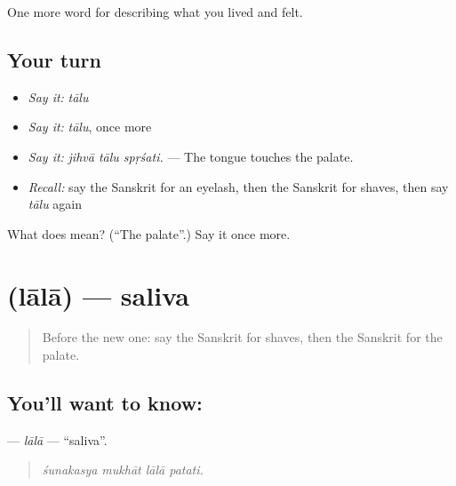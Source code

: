 \begin{grammarlens}[title={What you've built}]
One more word for describing what you lived and felt.
\end{grammarlens}

\subsection*{Your turn}
\begin{itemize}
\raggedright
  \item \emph{Say it:} \emph{tālu}
  \item \emph{Say it:} \emph{tālu}, once more
  \item \emph{Say it:} \emph{jihvā tālu spṛśati.} — The tongue touches the palate.
  \item \emph{Recall:} say the Sanskrit for an eyelash, then the Sanskrit for shaves, then say \emph{tālu} again
\end{itemize}

\begin{tcolorbox}[breakable,colback=teal!4,colframe=teal!35!black,title={Before you move on}]
What does  mean? (\textquotedblleft{}The palate\textquotedblright{}.) Say it once more.
\end{tcolorbox}
\section[\texorpdfstring{\sk{लाला} (lālā)}{लाला (lālā)}]{ (lālā) — saliva}

\label{lesson:SA-C472-lala}



\begin{quote}
Before the new one: say the Sanskrit for shaves, then the Sanskrit for the palate.
\end{quote}

\subsection*{You'll want to know: }
\textbf{} — \emph{lālā} — \textquotedblleft{}saliva\textquotedblright{}.

\begin{quote}
   
\end{quote}

\begin{quote}
\emph{śunakasya mukhāt lālā patati.}
\end{quote}

